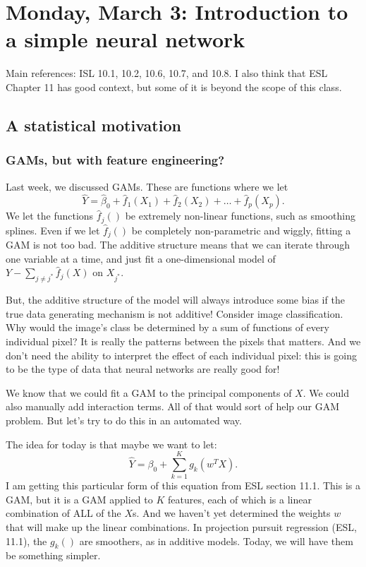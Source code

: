 \section{Monday, March 3: Introduction to a simple neural network}

Main references: ISL 10.1, 10.2, 10.6, 10.7, and 10.8. I also think that ESL Chapter 11 has good context, but some of it is beyond the scope of this class. 

\subsection{A statistical motivation}

\subsubsection{GAMs, but with feature engineering?}

Last week, we discussed GAMs. These are functions where we let
$$
\hat{Y} = \hat{\beta}_0 + \hat{f}_1 (X_1) + \hat{f}_2 (X_2) + \ldots + \hat{f}_p (X_p).
$$
We let the functions $\hat{f}_j()$ be extremely non-linear functions, such as smoothing splines. Even if we let $\hat{f}_j()$ be completely non-parametric and wiggly, fitting a GAM is not too bad. The additive structure means that we can iterate through one variable at a time, and just fit a one-dimensional model of $Y - \sum_{j \neq  j^*} \hat{f}_j(X)$ on $X_{j^*}$.

But, the additive structure of the model will always introduce some bias if the true data generating mechanism is not additive! Consider image classification. Why would the image's class be determined by a sum of functions of every individual pixel? It is really the patterns between the pixels that matters. And we don't need the ability to interpret the effect of each individual pixel: this is going to be the type of data that neural networks are really good for!

We know that we could fit a GAM to the principal components of $X$. We could also manually add interaction terms. All of that would sort of help our GAM problem. But let's try to do this in an automated way.

The idea for today is that maybe we want to let:
$$
\hat{Y} = {\beta}_0 + \sum_{k=1}^K g_k(w^T X).
$$
I am getting this particular form of this equation from ESL section 11.1. This is a GAM, but it is a GAM applied to $K$ features, each of which is a linear combination of ALL of the $X$s. And we haven't yet determined the weights $w$ that will make up the linear combinations. In projection pursuit regression (ESL, 11.1), the $g_k()$ are smoothers, as in additive models. Today, we will have them be something simpler. 

